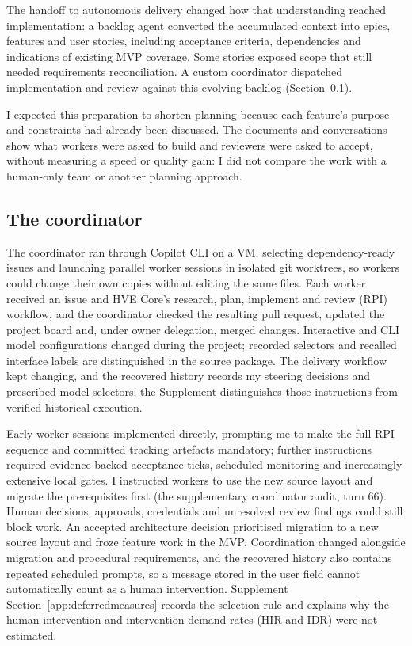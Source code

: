 \documentclass[11pt,a4paper]{article}
\begin{document}
The handoff to autonomous delivery changed how that understanding reached implementation: a backlog agent converted the accumulated context into
epics, features and user stories, including acceptance criteria, dependencies
and indications of existing MVP coverage. Some stories exposed scope that still needed requirements reconciliation.
A custom coordinator dispatched
implementation and review against this evolving backlog
(Section~\ref{sec:coordinator}).

I expected this preparation to shorten planning because each feature's
purpose and constraints had already been discussed. The documents and
conversations show what workers were asked to build and reviewers were asked to accept, without measuring a speed or quality gain: I did not
compare the work with a human-only team or another planning approach.

\subsection{The coordinator}\label{sec:coordinator}

The coordinator ran through Copilot CLI on a VM, selecting dependency-ready
issues and launching parallel worker sessions in isolated git worktrees,
so workers could change their own copies without editing the same files.
Each worker received an issue and HVE Core's research, plan, implement and review (RPI) workflow, and the coordinator checked the resulting pull request,
updated the project board and, under owner delegation, merged changes.
Interactive and CLI model configurations changed during the project;
recorded selectors and recalled interface labels are distinguished in the
source package. The delivery workflow kept changing, and the recovered history records my steering decisions and prescribed model
selectors; the Supplement distinguishes those instructions from verified
historical execution.

Early worker sessions implemented directly, prompting me to make
the full RPI sequence and committed tracking artefacts mandatory; further
instructions required evidence-backed acceptance ticks, scheduled monitoring
and increasingly extensive local gates. I instructed workers to use the new
source layout and migrate the prerequisites first
(the supplementary coordinator audit, turn 66).
Human decisions, approvals, credentials and unresolved review findings could still block work.
An accepted architecture decision prioritised migration to a new source layout and froze feature work in the MVP\@. Coordination changed alongside migration and procedural requirements,
and the recovered history also contains repeated scheduled prompts, so a
message stored in the user field cannot automatically count as a human
intervention. Supplement Section~\ref{app:deferredmeasures} records the
selection rule and explains why the human-intervention and
intervention-demand rates (HIR and IDR) were not estimated.
\end{document}

